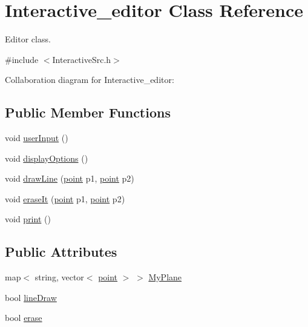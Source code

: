 \hypertarget{classInteractive__editor}{}\section{Interactive\+\_\+editor Class Reference}
\label{classInteractive__editor}


Editor class.  




{\ttfamily \#include $<$Interactive\+Src.\+h$>$}



Collaboration diagram for Interactive\+\_\+editor\+:
\subsection*{Public Member Functions}
\begin{DoxyCompactItemize}
\item 
void \hyperlink{classInteractive__editor_aa7d472e169eed213d1fcb874c6f5a6cd}{user\+Input} ()
\item 
void \hyperlink{classInteractive__editor_a8078ec1404bdd80e09320d14d198f628}{display\+Options} ()
\item 
void \hyperlink{classInteractive__editor_a5a7723f6affebd15ae935eb48e91359f}{draw\+Line} (\hyperlink{structpoint}{point} p1, \hyperlink{structpoint}{point} p2)
\item 
void \hyperlink{classInteractive__editor_a678c382483cb0b40d1616c1d28eaf200}{erase\+It} (\hyperlink{structpoint}{point} p1, \hyperlink{structpoint}{point} p2)
\item 
void \hyperlink{classInteractive__editor_aedd168ce9dc711e3756aafa44146cb76}{print} ()
\end{DoxyCompactItemize}
\subsection*{Public Attributes}
\begin{DoxyCompactItemize}
\item 
map$<$ string, vector$<$ \hyperlink{structpoint}{point} $>$ $>$ \hyperlink{classInteractive__editor_a1e77c81fdaf1da82816d476fa431fc34}{My\+Plane}
\item 
bool \hyperlink{classInteractive__editor_aa0de8abac09ce2259252fba6c1958e83}{line\+Draw}
\item 
bool \hyperlink{classInteractive__editor_ac2f2f1dfb6c21585d4ed5ed043e41b25}{erase}
\end{DoxyCompactItemize}


